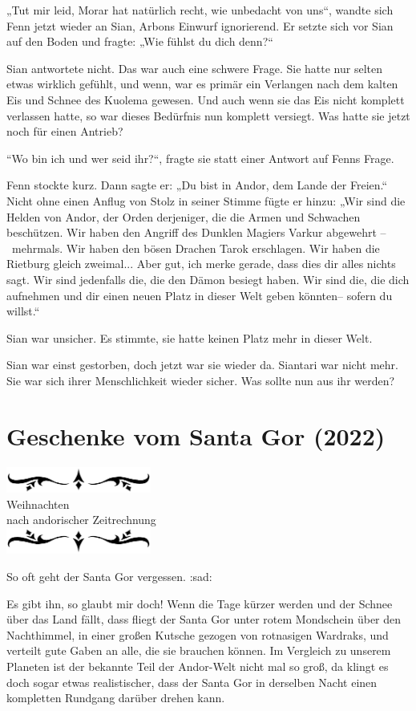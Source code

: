 \documentclass[10pt, a4paper, oneside]{book}
\newcommand{\az}[1]{%
    \begin{center}
        \includegraphics[width=180px]{Das Erbe des Wunderkindes/verzierung1.png}\\
        {\Huge #1} \\
        {nach andorischer Zeitrechnung}\\
        \includegraphics[width=180px]{Das Erbe des Wunderkindes/verzierung2.png}
    \end{center}
    \extramarks{}{#1 a.Z.}
}
\begin{document}
„Tut mir leid, Morar hat natürlich recht, wie unbedacht von uns“, wandte sich Fenn jetzt wieder an Sian, Arbons Einwurf ignorierend. Er setzte sich vor Sian auf den Boden und fragte: „Wie fühlst du dich denn?“

Sian antwortete nicht. Das war auch eine schwere Frage. Sie hatte nur selten etwas wirklich gefühlt, und wenn, war es primär ein Verlangen nach dem kalten Eis und Schnee des Kuolema gewesen. Und auch wenn sie das Eis nicht komplett verlassen hatte, so war dieses Bedürfnis nun komplett versiegt. Was hatte sie jetzt noch für einen Antrieb?

“Wo bin ich und wer seid ihr?“, fragte sie statt einer Antwort auf Fenns Frage.

Fenn stockte kurz. Dann sagte er: „Du bist in Andor, dem Lande der Freien.“ Nicht ohne einen Anflug von Stolz in seiner Stimme fügte er hinzu: „Wir sind die Helden von Andor, der Orden derjeniger, die die Armen und Schwachen beschützen. Wir haben den Angriff des Dunklen Magiers Varkur abgewehrt – mehrmals. Wir haben den bösen Drachen Tarok erschlagen. Wir haben die Rietburg gleich zweimal... Aber gut, ich merke gerade, dass dies dir alles nichts sagt. Wir sind jedenfalls die, die den Dämon besiegt haben. Wir sind die, die dich aufnehmen und dir einen neuen Platz in dieser Welt geben könnten– sofern du willst.“

Sian war unsicher. Es stimmte, sie hatte keinen Platz mehr in dieser Welt.

Sian war einst gestorben, doch jetzt war sie wieder da. Siantari war nicht mehr. Sie war sich ihrer Menschlichkeit wieder sicher. Was sollte nun aus ihr werden?











\newpage
\section{Geschenke vom Santa Gor (2022)}

\az{Weihnachten}

So oft geht der Santa Gor vergessen. :sad:

Es gibt ihn, so glaubt mir doch! Wenn die Tage kürzer werden und der Schnee über das Land fällt, dass fliegt der Santa Gor unter rotem Mondschein über den Nachthimmel, in einer großen Kutsche gezogen von rotnasigen Wardraks, und verteilt gute Gaben an alle, die sie brauchen können. Im Vergleich zu unserem Planeten ist der bekannte Teil der Andor-Welt nicht mal so groß, da klingt es doch sogar etwas realistischer, dass der Santa Gor in derselben Nacht einen kompletten Rundgang darüber drehen kann.
\end{document}
